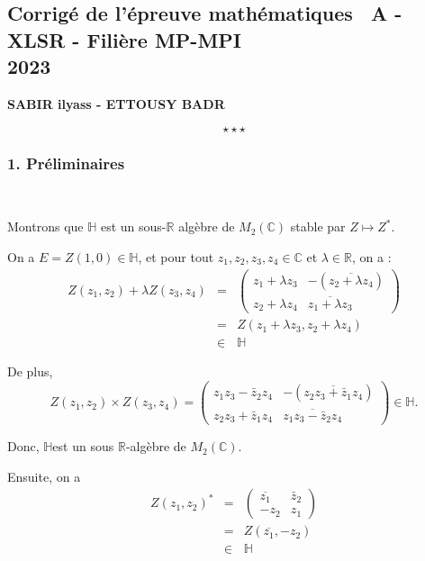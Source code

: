 \begin{center}
\subsection*{Corrig{\'e} de l'{\'e}preuve math{\'e}matiques \ A - \\ XLSR - Fili{\`e}re MP-MPI\\ 2023}\label{mathA_2023}
\textbf{SABIR ilyass - ETTOUSY BADR}
\end{center}
\[
\star \star \star
\]

\subsubsection*{1. Pr{\'e}liminaires}

\

Montrons que $\mathbb{H}$ est un sous-$\mathbb{R}$
alg{\`e}bre de $M_2 (\mathbb{C})$ stable par $Z \longmapsto Z^{\ast}$.

On a $E = Z (1, 0) \in \mathbb{H}$, et pour tout $z_1, z_2, z_3, z_4 \in
\mathbb{C}$ et $\lambda \in \mathbb{R}$, on a :
\begin{eqnarray*}
  Z (z_1, z_2) + \lambda Z (z_3, z_4) & = & \left(\begin{array}{cc}
    z_1 + \lambda z_3 & - (\overline{z_2 + \lambda z_4})\\
    z_2 + \lambda z_4 & \overline{z_1 + \lambda z_3}
  \end{array}\right)\\
  & = & Z (z_1 + \lambda z_3, z_2 + \lambda z_4)\\
  & \in & \mathbb{H}
\end{eqnarray*}


De plus,
\[ Z (z_1, z_2) \times Z (z_3, z_4) = \left(\begin{array}{cc}
     z_1 z_3 - \bar{z}_2 z_4 & - (\overline{z_2 z_3 + \bar{z}_1 z_4})\\
     z_2 z_3 + \bar{z}_1 z_4 & \overline{z_1 z_3 - \bar{z}_2 z_4}
   \end{array}\right) \in \mathbb{H}. \]


Donc, $\mathbb{H}$est un sous $\mathbb{R}$-alg{\`e}bre de $M_2 (\mathbb{C})$.

Ensuite, on a
\begin{eqnarray*}
  Z (z_1, z_2)^{\ast} & = & \left(\begin{array}{cc}
    \overline{z_1} & \bar{z}_2\\
    - z_2 & z_1
  \end{array}\right)\\
  & = & Z (\overline{z_1}, - z_2)\\
  & \in & \mathbb{H}
\end{eqnarray*}


